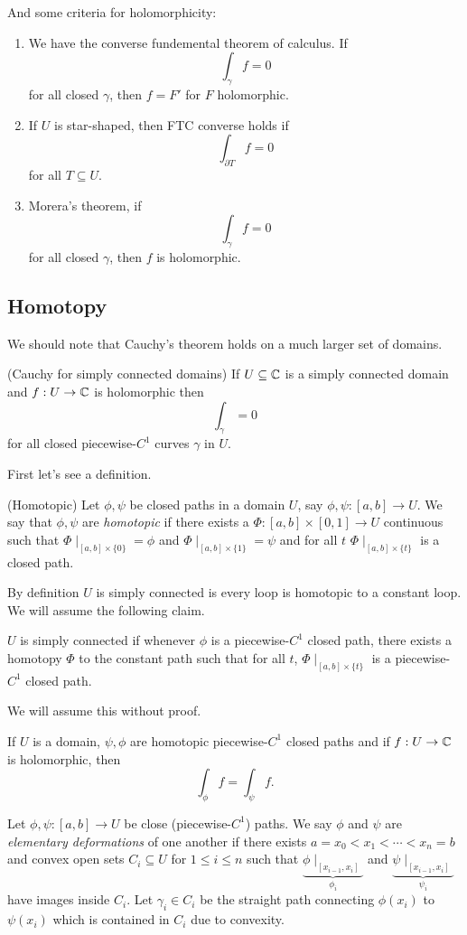 \documentclass{article}
\begin{document}
And some criteria for holomorphicity:
\begin{enumerate}
	\item We have the converse fundemental theorem of calculus. If
		\[
		  \int_\gamma f = 0
		\]
		for all closed $ \gamma $, then $ f=F' $ for $ F $ holomorphic.
	\item If $ U $ is star-shaped, then FTC converse holds if
		\[
			\int_{\partial T} f = 0
		\]
		for all $ T\subseteq U $.
	\item Morera's theorem, if
		\[
		  \int_\gamma f = 0
		\]
		for all closed $ \gamma $, then $ f $ is holomorphic.
\end{enumerate}
\subsection{Homotopy}
We should note that Cauchy's theorem holds on a much larger set of domains.
\begin{theorem}
	(Cauchy for simply connected domains) If $ U\subseteq \mathbb{C} $ is a simply connected domain and $ f:U\to \mathbb{C} $ is holomorphic then
	\[
	  \int_\gamma =0
	\]
	for all closed piecewise-$ C^1 $ curves $ \gamma $ in $ U $.
\end{theorem}
First let's see a definition.
\begin{definition}
	(Homotopic) Let $ \phi,\psi $ be closed paths in a domain $ U $, say $ \phi,\psi: [a,b] \to U $. We say that $ \phi,\psi $ are \textit{homotopic} if there exists a $ \Phi:[a,b]\times [0,1] \to U $ continuous such that $ \Phi\mid_{[a,b] \times \{0\}} = \phi $ and $ \Phi\mid_{[a,b]\times \{1\}} = \psi $ and for all $ t $ $ \Phi\mid_{[a,b]\times \{t\}} $ is a closed path.
\end{definition}
By definition $ U $ is simply connected is every loop is homotopic to a constant loop. We will assume the following claim.
\begin{claim}
	$ U $ is simply connected if whenever $ \phi $ is a piecewise-$ C^1 $ closed path, there exists a homotopy $ \Phi $ to the constant path such that for all $ t $, $ \Phi\mid_{[a,b]\times \{t\}} $ is a piecewise-$ C^1 $ closed path.
\end{claim}
We will assume this without proof.
\begin{proposition}
  If $ U $ is a domain, $ \psi,\phi $ are homotopic piecewise-$ C^1 $ closed paths and if $ f:U\to \mathbb{C} $ is holomorphic, then
  \[
    \int_\phi f = \int_\psi f.
  \]
\end{proposition}
\pf Let $ \phi,\psi:[a,b] \to U $ be close (piecewise-$ C^1 $) paths. We say $ \phi $ and $ \psi $ are \textit{elementary deformations} of one another if there exists $ a = x_0<x_1<\cdots< x_n = b $ and convex open sets $ C_i\subseteq U $ for $ 1\le i \le n $ such that $\underbrace{\phi\mid_{[x_{i-1},x_i]}}_{\phi_i} $ and $ \underbrace{\psi\mid_{[x_{i-1},x_i]}}_{\psi_i} $ have images inside $ C_i $. Let $ \gamma_i \in C_i$ be the straight path connecting $ \phi(x_i) $ to $ \psi(x_i) $ which is contained in $ C_i $ due to convexity.
\end{document}
